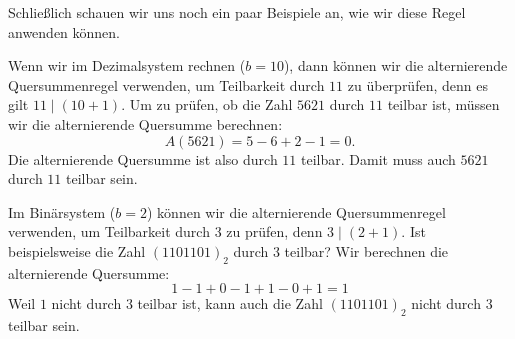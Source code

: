 \documentclass[../../main.tex]{subfiles}
\begin{document}
Schließlich schauen wir uns noch ein paar Beispiele an, wie wir diese Regel anwenden können.
\begin{advexample}{}
    Wenn wir im Dezimalsystem rechnen ($b=10$), dann können wir die alternierende Quersummenregel verwenden, um Teilbarkeit durch $11$ zu überprüfen, denn es gilt $11\mid(10+1)$. Um zu prüfen, ob die Zahl $5621$ durch $11$ teilbar ist, müssen wir die alternierende Quersumme berechnen:
    \[A(5621)=5-6+2-1=0.\]
    Die alternierende Quersumme ist also durch $11$ teilbar. Damit muss auch $5621$ durch $11$ teilbar sein.
\end{advexample}
\begin{advexample}{}
    Im Binärsystem ($b=2$) können wir die alternierende Quersummenregel verwenden, um Teilbarkeit durch $3$ zu prüfen, denn $3\mid(2+1)$. Ist beispielsweise die Zahl $(1101101)_2$ durch $3$ teilbar? Wir berechnen die alternierende Quersumme:
    \[1-1+0-1+1-0+1=1\]
    Weil $1$ nicht durch $3$ teilbar ist, kann auch die Zahl $(1101101)_2$ nicht durch $3$ teilbar sein.
\end{advexample}

\newpage
\pagecolor{white}
\end{document}
